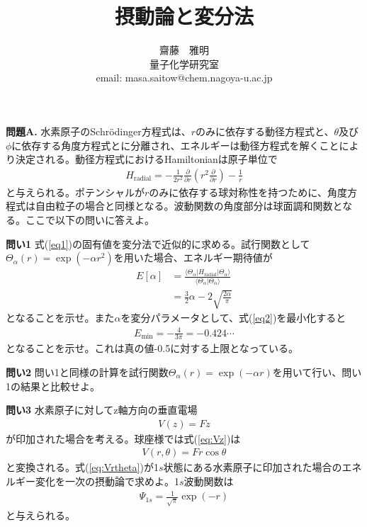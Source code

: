 \documentclass[11pt,pra,aps]{revtex4}
\begin{document}
\title{摂動論と変分法}
\author{齋藤　雅明 \\ 量子化学研究室 \\ email: masa.saitow@chem.nagoya-u.ac.jp}

\maketitle

\noindent
{\bf 問題A.} 水素原子のSchr\"odinger方程式は、$r$のみに依存する動径方程式と、$\theta$及び$\phi$に依存する角度方程式とに分離され、エネルギーは動径方程式を解くことにより決定される。動径方程式におけるHamiltonianは原子単位で
\begin{align}
  H_\text{radial}=-\frac{1}{2r^2}\frac{\partial}{\partial r}\left(r^2 \frac{\partial}{\partial r}\right) - \frac{1}{r} \label{eq1}
\end{align}
と与えられる。ポテンシャルが$r$のみに依存する球対称性を持つために、角度方程式は自由粒子の場合と同様となる。波動関数の角度部分は球面調和関数となる。ここで以下の問いに答えよ。

\noindent
{\bf 問い1} 式(\ref{eq1})の固有値を変分法で近似的に求める。試行関数として$\Theta_\alpha(r)=\exp(-\alpha r^2)$を用いた場合、エネルギー期待値が
\begin{align}
  E[\alpha] &= \frac{\langle\Theta_\alpha|H_\text{radial}|\Theta_\alpha\rangle}{\langle\Theta_\alpha|\Theta_\alpha\rangle} \\ \nonumber
            &= \frac{3}{2}\alpha - 2\sqrt{\frac{2\alpha}{\pi}} \label{eq2}
\end{align}
となることを示せ。また$\alpha$を変分パラメータとして、式(\ref{eq2})を最小化すると
\begin{align}
  E_\text{min}=-\frac{4}{3\pi}=-0.424\cdots
\end{align}
となることを示せ。これは真の値-0.5に対する上限となっている。

\noindent
{\bf 問い2} 問い1と同様の計算を試行関数$\Theta_\alpha(r)=\exp(-\alpha r)$を用いて行い、問い1の結果と比較せよ。

\noindent
{\bf 問い3} 水素原子に対してz軸方向の垂直電場
\begin{align}
  V(z)=Fz \label{eq:Vz}
\end{align}
が印加された場合を考える。球座様では式(\ref{eq:Vz})は
\begin{align}
  V(r,\theta)=Fr\cos\theta \label{eq:Vrtheta}
\end{align}
と変換される。式(\ref{eq:Vrtheta})が1$s$状態にある水素原子に印加された場合のエネルギー変化を一次の摂動論で求めよ。1$s$波動関数は
\begin{align}
  \Psi_{1s}=\frac{1}{\sqrt{\pi}} \exp(-r)
\end{align}
と与えられる。
\end{document}
